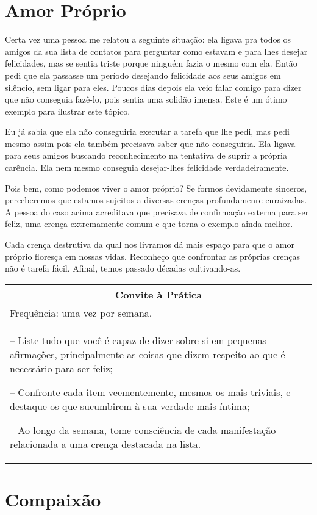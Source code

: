 \documentclass[oneside, 12pt]{book}
\newenvironment{prat}[1]
{\begin{center}
\begin{tabular}{p{0.9\textwidth}}
\hline\hline
\multicolumn{1}{c}{Convite à Prática}\\
\hline
Frequência: #1.\\
\hline
}{\\
\hline\hline
\end{tabular} 
\end{center}}
\begin{document}
\section*{Amor Próprio}

Certa vez uma pessoa me relatou a seguinte situação: ela ligava pra todos os amigos da sua lista de contatos para perguntar como estavam e para lhes desejar felicidades, mas se sentia triste porque ninguém fazia o mesmo com ela. Então pedi que ela passasse um período desejando felicidade aos seus amigos em silêncio, sem ligar para eles. Poucos dias depois ela veio falar comigo para dizer que não conseguia fazê-lo, pois sentia uma solidão imensa. Este é um ótimo exemplo para ilustrar este tópico.

Eu já sabia que ela não conseguiria executar a tarefa que lhe pedi, mas pedi mesmo assim pois ela também precisava saber que não conseguiria. Ela ligava para seus amigos buscando reconhecimento na tentativa de suprir a própria carência. Ela nem mesmo conseguia desejar-lhes felicidade verdadeiramente.

Pois bem, como podemos viver o amor próprio? Se formos devidamente sinceros, perceberemos que estamos sujeitos a diversas crenças profundamenre enraizadas. A pessoa do caso acima acreditava que precisava de confirmação externa para ser feliz, uma crença extremamente comum e que torna o exemplo ainda melhor.

Cada crença destrutiva da qual nos livramos dá mais espaço para que o amor próprio floresça em nossas vidas. Reconheço que confrontar as próprias crenças não é tarefa fácil. Afinal, temos passado décadas cultivando-as.

\begin{prat}{uma vez por semana}
-- Liste tudo que você é capaz de dizer sobre si em pequenas afirmações, principalmente as coisas que dizem respeito ao que é necessário para ser feliz;

-- Confronte cada item veementemente, mesmos os mais triviais, e destaque os que sucumbirem à sua verdade mais íntima;

-- Ao longo da semana, tome consciência de cada manifestação relacionada a uma crença destacada na lista.
\end{prat}

\section*{Compaixão}
\end{document}
